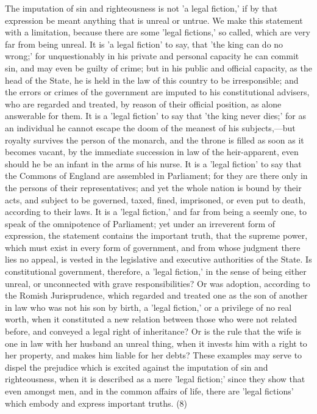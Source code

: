 \documentclass[
]{book}
\begin{document}
The imputation of sin and righteousness is not 'a legal fiction,' if by that expression be meant anything that is unreal or untrue. We make this statement with a limitation, because there are some 'legal fictions,' so called, which are very far from being unreal. It is 'a legal fiction' to say, that 'the king can do no wrong;' for unquestionably in his private and personal capacity he can commit sin, and may even be guilty of crime; but in his public and official capacity, as the head of the State, he is held in the law of this country to be irresponsible; and the errors or crimes of the government are imputed to his constitutional advisers, who are regarded and treated, by reason of their official position, as alone answerable for them. It is a 'legal fiction' to say that 'the king never dies;' for as an individual he cannot escape the doom of the meanest of his subjects,---but royalty survives the person of the monarch, and the throne is filled as soon as it becomes vacant, by the immediate succession in law of the heir-apparent, even should he be an infant in the arms of his nurse. It is a 'legal fiction' to say that the Commons of England are assembled in Parliament; for they are there only in the persons of their representatives; and yet the whole nation is bound by their acts, and subject to be governed, taxed, fined, imprisoned, or even put to death, according to their laws. It is a 'legal fiction,' and far from being a seemly one, to speak of the omnipotence of Parliament; yet under an irreverent form of expression, the statement contains the important truth, that the supreme power, which must exist in every form of government, and from whose judgment there lies no appeal, is vested in the legislative and executive authorities of the State. Is constitutional government, therefore, a 'legal fiction,' in the sense of being either unreal, or unconnected with grave responsibilities? Or was adoption, according to the Romish Jurisprudence, which regarded and treated one as the son of another in law who was not his son by birth, a 'legal fiction,' or a privilege of no real worth, when it constituted a new relation between those who were not related before, and conveyed a legal right of inheritance? Or is the rule that the wife is one in law with her husband an unreal thing, when it invests him with a right to her property, and makes him liable for her debts? These examples may serve to dispel the prejudice which is excited against the imputation of sin and righteousness, when it is described as a mere 'legal fiction;' since they show that even amongst men, and in the common affairs of life, there are 'legal fictions' which embody and express important truths. (8)
\end{document}
